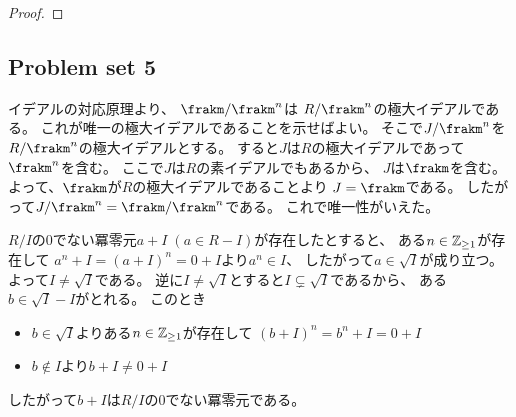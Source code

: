\documentclass[report]{jlreq}
\begin{document}
\begin{proof}
    \TODO{}
\end{proof}

\subsection{Problem set 5}


\begin{answer}
    イデアルの対応原理より、
    $\frakm / \frakm^n$は
    $R / \frakm^n$の極大イデアルである。
    これが唯一の極大イデアルであることを示せばよい。
    そこで$J / \frakm^n$を$R / \frakm^n$の極大イデアルとする。
    すると$J$は$R$の極大イデアルであって$\frakm^n$を含む。
    ここで$J$は$R$の素イデアルでもあるから、
    $J$は$\frakm$を含む。
    よって、$\frakm$が$R$の極大イデアルであることより
    $J = \frakm$である。
    したがって$J / \frakm^n = \frakm / \frakm^n$である。
    これで唯一性がいえた。
\end{answer}



\begin{answer}
    $R / I$の$0$でない冪零元$a + I \; (a \in R - I)$が存在したとすると、
    ある$n \in \mathbb{Z}_{\ge 1}$が存在して
    $a^n + I = (a + I)^n = 0 + I$より$a^n \in I$、
    したがって$a \in \sqrt{I}$が成り立つ。
    よって$I \neq \sqrt{I}$である。
    逆に$I \neq \sqrt{I}$とすると$I \subsetneq \sqrt{I}$であるから、
    ある$b \in \sqrt{I} - I$がとれる。
    このとき
    \begin{itemize}
        \item $b \in \sqrt{I}$よりある$n \in \mathbb{Z}_{\ge 1}$が存在して
            $(b + I)^n = b^n + I = 0 + I$
        \item $b \not\in I$より$b + I \neq 0 + I$
    \end{itemize}
    したがって$b + I$は$R / I$の$0$でない冪零元である。
\end{answer}
\end{document}
